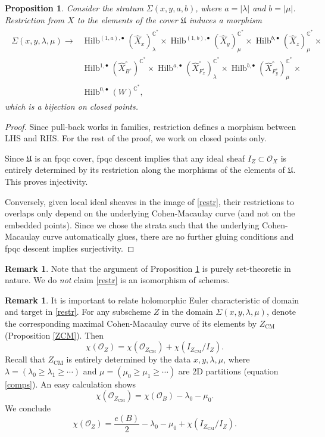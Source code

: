 \documentclass{amsart}
\newtheorem{proposition}[theorem]{Proposition}
\theoremstyle{definition}
\newtheorem{remark}[theorem]{Remark}
\newcommand{\CC} {\mathbb{C}}          %
\renewcommand{\O}{\mathcal{O}}
\newcommand{\Hilb}{\operatorname{Hilb}}
\newcommand{\CM}{\operatorname{CM}}
\begin{document}
\begin{proposition} \label{bij}
Consider the stratum $\Sigma(x,y,a,b)$, where $a = |\lambda|$ and $b = |\mu|$. Restriction from $X$ to the elements of the cover $\mathfrak{U}$ induces a morphism
\begin{align}
\begin{split} \label{restr}
\Sigma(x,y,\lambda,\mu) \longrightarrow &\Hilb^{(1,a),\bullet}(\widehat{X}_x)_{\lambda}^{\CC^*} \times \Hilb^{(1,b),\bullet}(\widehat{X}_y)_{\mu}^{\CC^*} \times \Hilb^{b,\bullet}(\widehat{X}_z)_{\mu}^{\CC^*} \times \\
&\Hilb^{1,\bullet}(\widehat{X}^{\circ}_{B^\circ})^{\CC^*} \times \Hilb^{a,\bullet}(\widehat{X}^{\circ}_{F_{x}^{\circ}})_{\lambda}^{\CC^*} \times \Hilb^{b,\bullet}(\widehat{X}^{\circ}_{F_{y}^{\circ}})_{\mu}^{\CC^*} \times \\
&\Hilb^{0,\bullet}(W)^{\CC^*},
\end{split}
\end{align}
which is a bijection on closed points.
\end{proposition}
\begin{proof}
Since pull-back works in families, restriction defines a morphism between LHS and RHS. For the rest of the proof, we work on closed points only.

Since $\mathfrak{U}$ is an fpqc cover, fpqc descent implies that any ideal sheaf $I_Z \subset \O_X$ is entirely determined by its restriction along the morphisms of the elements of $\mathfrak{U}$. This proves injectivity.

Conversely, given local ideal sheaves in the image of \eqref{restr}, their restrictions to overlaps only depend on the underlying Cohen-Macaulay curve (and not on the embedded points). Since we chose the strata such that the underlying Cohen-Macaulay curve automatically glues, there are no further gluing conditions and fpqc descent implies surjectivity.
\end{proof}
   
\begin{remark}
Note that the argument of Proposition \ref{bij} is purely set-theoretic in nature. We do \emph{not} claim \eqref{restr} is an isomorphism of schemes. 
\end{remark}

\begin{remark}
It is important to relate holomorphic Euler characteristic of domain and target in \eqref{restr}. For any subscheme $Z$ in the domain $\Sigma(x,y,\lambda,\mu)$, denote the corresponding maximal Cohen-Macaulay curve of its elements by $Z_{\CM}$ (Proposition \ref{ZCM}). Then
$$
\chi(\O_Z) = \chi(\O_{Z_{\CM}}) + \chi(I_{Z_{\CM}} / I_{Z}).
$$ 
Recall that $Z_{\CM}$ is entirely determined by the data $x,y, \lambda, \mu$, where $\lambda = (\lambda_0 \geq \lambda_1 \geq \cdots)$ and $\mu = (\mu_0 \geq \mu_1 \geq \cdots)$ are 2D partitions (equation \eqref{comps}). An easy calculation shows 
$$
\chi(\O_{Z_{\CM}}) = \chi(\O_B) - \lambda_0 - \mu_0.
$$
We conclude
\begin{equation} \label{relchi}
\chi(\O_Z) = \frac{e(B)}{2} - \lambda_0 - \mu_0 + \chi(I_{Z_{\CM}} / I_{Z}).
\end{equation}
\end{remark}
\end{document}
